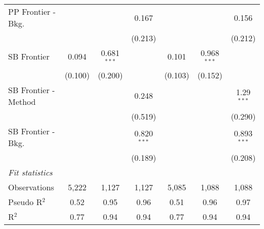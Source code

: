 \begin{tabular}{lcccccc}
   PP Frontier - Bkg.   &                &               & 0.167         &                &               & 0.156\\   
                        &                &               & (0.213)       &                &               & (0.212)\\   
   SB Frontier          & 0.094          & 0.681$^{***}$ &               & 0.101          & 0.968$^{***}$ &   \\   
                        & (0.100)        & (0.200)       &               & (0.103)        & (0.152)       &   \\   
   SB Frontier - Method &                &               & 0.248         &                &               & 1.29$^{***}$\\   
                        &                &               & (0.519)       &                &               & (0.290)\\   
   SB Frontier - Bkg.   &                &               & 0.820$^{***}$ &                &               & 0.893$^{***}$\\   
                        &                &               & (0.189)       &                &               & (0.208)\\   
   \midrule
   \emph{Fit statistics}\\
   Observations         & 5,222          & 1,127         & 1,127         & 5,085          & 1,088         & 1,088\\  
   Pseudo R$^2$         & 0.52           & 0.95          & 0.96          & 0.51           & 0.96          & 0.97\\  
   R$^2$                & 0.77           & 0.94          & 0.94          & 0.77           & 0.94          & 0.94\\  
   

\end{tabular}
